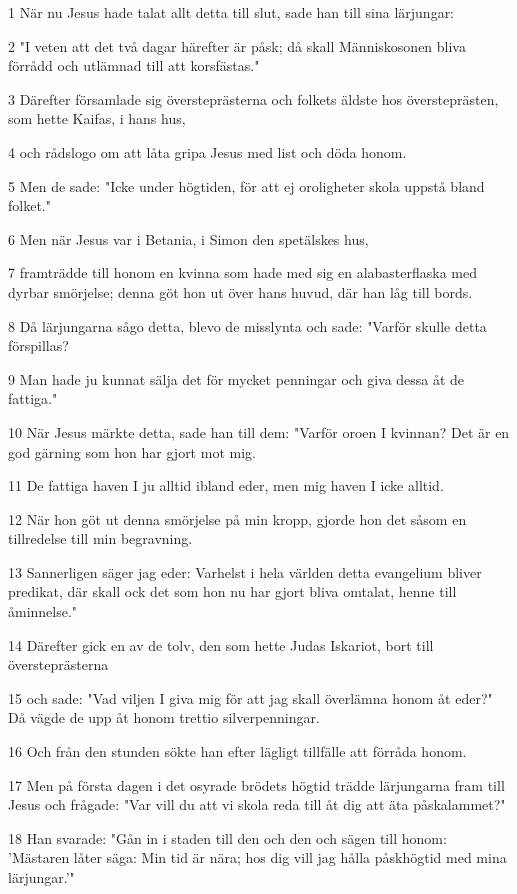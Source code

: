 \par 1 När nu Jesus hade talat allt detta till slut, sade han till sina lärjungar:
\par 2 "I veten att det två dagar härefter är påsk; då skall Människosonen bliva förrådd och utlämnad till att korsfästas."
\par 3 Därefter församlade sig översteprästerna och folkets äldste hos översteprästen, som hette Kaifas, i hans hus,
\par 4 och rådslogo om att låta gripa Jesus med list och döda honom.
\par 5 Men de sade: "Icke under högtiden, för att ej oroligheter skola uppstå bland folket."
\par 6 Men när Jesus var i Betania, i Simon den spetälskes hus,
\par 7 framträdde till honom en kvinna som hade med sig en alabasterflaska med dyrbar smörjelse; denna göt hon ut över hans huvud, där han låg till bords.
\par 8 Då lärjungarna sågo detta, blevo de misslynta och sade: "Varför skulle detta förspillas?
\par 9 Man hade ju kunnat sälja det för mycket penningar och giva dessa åt de fattiga."
\par 10 När Jesus märkte detta, sade han till dem: "Varför oroen I kvinnan? Det är en god gärning som hon har gjort mot mig.
\par 11 De fattiga haven I ju alltid ibland eder, men mig haven I icke alltid.
\par 12 När hon göt ut denna smörjelse på min kropp, gjorde hon det såsom en tillredelse till min begravning.
\par 13 Sannerligen säger jag eder: Varhelst i hela världen detta evangelium bliver predikat, där skall ock det som hon nu har gjort bliva omtalat, henne till åminnelse."
\par 14 Därefter gick en av de tolv, den som hette Judas Iskariot, bort till översteprästerna
\par 15 och sade: "Vad viljen I giva mig för att jag skall överlämna honom åt eder?" Då vägde de upp åt honom trettio silverpenningar.
\par 16 Och från den stunden sökte han efter lägligt tillfälle att förråda honom.
\par 17 Men på första dagen i det osyrade brödets högtid trädde lärjungarna fram till Jesus och frågade: "Var vill du att vi skola reda till åt dig att äta påskalammet?"
\par 18 Han svarade: "Gån in i staden till den och den och sägen till honom: 'Mästaren låter säga: Min tid är nära; hos dig vill jag hålla påskhögtid med mina lärjungar.'"
